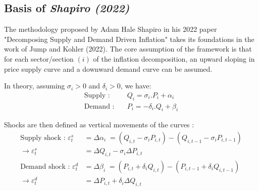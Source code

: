 \subsection{Basis of \textit{Shapiro (2022)}}

The methodology proposed by Adam Hale Shapiro in his 2022 paper "Decomposing Supply and Demand Driven Inflation" takes its foundations in the work of Jump and Kohler (2022).
The core assumption of the framework is that for each sector/section $(i)$ of the inflation decomposition, an upward sloping in price supply curve and a downward demand curve can be assumed.

\begin{center}
\end{center}

\noindent In theory, assuming $\sigma_{i}>0$ and $\delta_{i}>0$, we have:
\begin{align*}
    \textrm{Supply :} & \quad Q_{i} = \sigma_{i}.P_{i} + \alpha_{i}\\
    \textrm{Demand :} & \quad P_{i} = -\delta_{i}.Q_{i} + \beta_{i}
\end{align*}

\noindent Shocks are then defined as vertical movements of the curves :
\begin{align*}
    \textrm{Supply shock : } \varepsilon_{t}^{s} &= \Delta \alpha_{i} \; = (Q_{i,t} - \sigma_{i}P_{i,t}) - (Q_{i,t-1} - \sigma_{i}P_{i,t-1})\\
    \rightarrow \varepsilon_{t}^{s} &= \Delta Q_{i,t} - \sigma_{i}\Delta P_{i,t}\\
    \textrm{Demand shock : } \varepsilon_{t}^{d} &= \Delta \beta_{i} \; = (P_{i,t} + \delta_{i}Q_{i,t}) - (P_{i,t-1} + \delta_{i}Q_{i,t-1})\\
    \rightarrow \varepsilon_{t}^{d} &= \Delta P_{i,t} + \delta_{i}\Delta Q_{i,t}
\end{align*}

